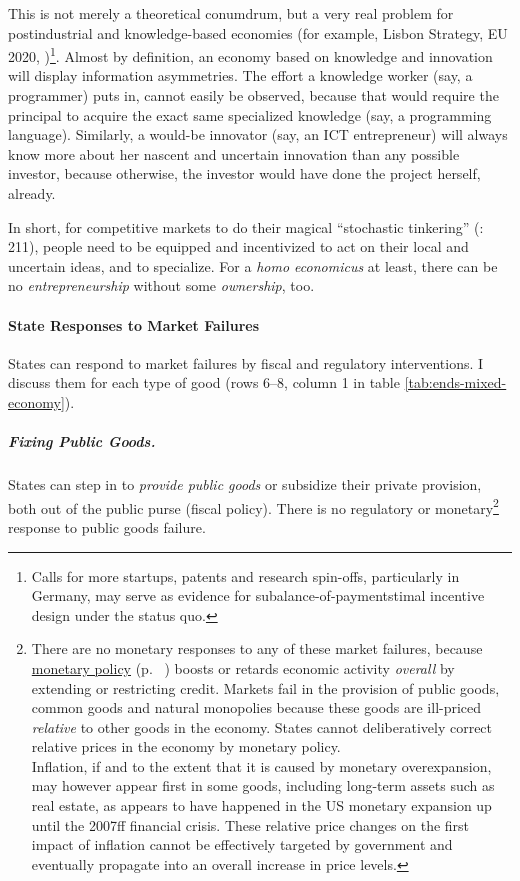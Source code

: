 This is not merely a theoretical conumdrum, but a very real problem for postindustrial  and knowledge-based economies (for example, Lisbon Strategy, EU 2020, \citealt{Bell-1973-aa})\footnote{
	Calls for more startups, patents and research spin-offs, particularly in Germany, may serve as evidence for subalance-of-paymentstimal incentive design under the status quo.}.
Almost by definition, an economy based on knowledge and innovation will display information asymmetries. The effort a knowledge worker (say, a programmer) puts in, cannot easily be observed, because that would require the principal to acquire the exact same specialized knowledge (say, a programming language). Similarly, a would-be innovator (say, an \gls{ICT} entrepreneur) will always know more about her nascent and uncertain innovation than any possible investor, because otherwise, the investor would have done the project herself, already.

In short, for competitive markets to do their magical ``stochastic tinkering'' (\citealt{Taleb2007}: 211), people need to be equipped and incentivized to act on their local and uncertain ideas, and to specialize. For a \emph{homo economicus} at least, there can be no \emph{entrepreneurship} without some \emph{ownership}, too.

\paragraph{State Responses to Market Failures}  \label{sec:stateresponses} States can respond to market failures by fiscal and regulatory interventions. I discuss them for each type of good (rows 6--8, column 1 in table \ref{tab:ends-mixed-economy}).

\subparagraph{Fixing Public Goods.}  \label{sec:public-good-response} States can step in to \emph{provide public goods} or subsidize their private provision, both out of the public purse (fiscal policy). There is no regulatory or monetary\footnote{
	\label{fn:monetary-commons}There are no monetary responses to any of these market failures, because \hyperref[sec:monetary]{monetary policy} (p.~ \pageref{sec:monetary}) boosts or retards economic activity \emph{overall} by extending or restricting credit. Markets fail in the provision of public goods, common goods and natural monopolies because these goods are ill-priced \emph{relative} to other goods in the economy. States cannot deliberatively correct relative prices in the economy by monetary policy. \\
	Inflation, if and to the extent that it is caused by monetary overexpansion, may however appear first in some goods, including long-term assets such as real estate, as appears to have happened in the US monetary expansion up until the 2007ff financial crisis. These relative price changes on the first impact of inflation cannot be effectively targeted by government and eventually propagate into an overall increase in price levels.} %
response to public goods failure.

